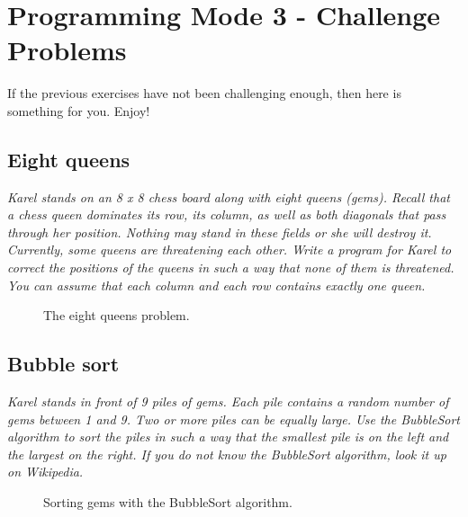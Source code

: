 \newpage

\section{Programming Mode 3 - Challenge Problems}

If the previous exercises have not been challenging enough, then here is something 
for you. Enjoy!

\subsection{Eight queens}

\noindent
{\em Karel stands on an 8 x 8 chess board along with eight queens (gems). Recall that a chess queen dominates its row, its column, as well as both diagonals that pass through her position. Nothing may stand in these fields or she will destroy it. Currently, some queens are threatening each other. Write a program for Karel to correct the positions of the queens in such a way that none of them is threatened. You can assume that each column and each row contains exactly one queen. }

\begin{figure}[!ht]
\begin{center}
\vspace{6cm}
\end{center}
\vspace{-4mm}
\caption{The eight queens problem.}
\label{fig:g14}
\end{figure}

\newpage
\subsection{Bubble sort}

\noindent
{\em Karel stands in front of 9 piles of gems. Each pile contains a random number of gems between 1 and 9. Two or more piles can be equally large. Use the BubbleSort algorithm to sort the piles in such a way that the smallest pile is on the left and the largest on the right. If you do not know the BubbleSort algorithm, look it up on Wikipedia.}

\begin{figure}[!ht]
\begin{center}
\vspace{6cm}
\end{center}
\vspace{-4mm}
\caption{Sorting gems with the BubbleSort algorithm.}
\label{fig:g13}
\end{figure}


